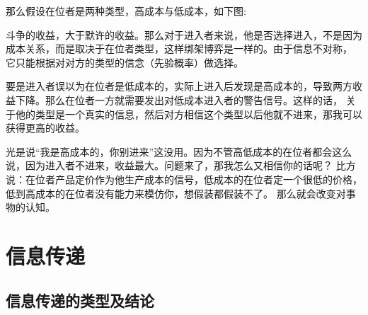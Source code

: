 \documentclass[12pt, a4paper]{article} %
\begin{document}
\begin{CJK*}{UTF8}{gbsn}
    那么假设在位者是两种类型，高成本与低成本，如下图:
    \begin{figure}[htbp]
        \centering
    \end{figure}
    斗争的收益，大于默许的收益。那么对于进入者来说，他是否选择进入，不是因为成本关系，而是取决于在位者类型，这样绑架博弈是一样的。由于信息不对称，
    它只能根据对对方的类型的信念（先验概率）做选择。\par
    要是进入者误以为在位者是低成本的，实际上进入后发现是高成本的，导致两方收益下降。那么在位者一方就需要发出对低成本进入者的警告信号。这样的话，
    关于他的类型是一个真实的信息，然后对方相信这个类型以后他就不进来，那我可以获得更高的收益。

    光是说“我是高成本的，你别进来”这没用。因为不管高低成本的在位者都会这么说，因为进入者不进来，收益最大。问题来了，那我怎么又相信你的话呢？
    比方说：在位者产品定价作为他生产成本的信号，低成本的在位者定一个很低的价格，低到高成本的在位者没有能力来模仿你，想假装都假装不了。
    那么就会改变对事物的认知。

    \clearpage
    \section{信息传递}

    \subsection{信息传递的类型及结论}


\end{CJK*}
\end{document}
